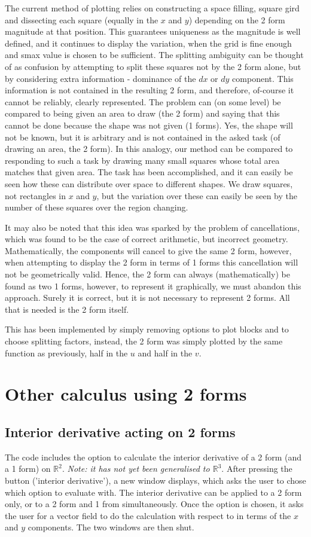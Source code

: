\documentclass[11]{report}
\begin{document}
The current method of plotting relies on constructing a space filling, square gird and dissecting each square (equally in the $x$ and $y$) depending on the 2 form magnitude at that position. This guarantees uniqueness as the magnitude is well defined, and it continues to display the variation, when the grid is fine enough and s\textunderscore max value is chosen to be sufficient.
The splitting ambiguity can be thought of as confusion by attempting to split these squares not by the 2 form alone, but by considering extra information - dominance of the $dx$ or $dy$ component. This information is not contained in the resulting 2 form, and therefore, of-course it cannot be reliably, clearly represented.
The problem can (on some level) be compared to being given an area to draw (the 2 form) and saying that this cannot be done because the shape was not given (1 forms). Yes, the shape will not be known, but it is arbitrary and is not contained in the asked task (of drawing an area, the 2 form). In this analogy, our method can be compared to responding to such a task by drawing many small squares whose total area matches that given area. The task has been accomplished, and it can easily be seen how these can distribute over space to different shapes. We draw squares, not rectangles in $x$ and $y$, but the variation over these can easily be seen by the number of these squares over the region changing.

It may also be noted that this idea was sparked by the problem of cancellations, which was found to be the case of correct arithmetic, but incorrect geometry. Mathematically, the components will cancel to give the same 2 form, however, when attempting to display the 2 form in terms of 1 forms this cancellation will not be geometrically valid.
Hence, the 2 form can always (mathematically) be found as two 1 forms, however, to represent it graphically, we must abandon this approach. Surely it is correct, but it is not necessary to represent 2 forms. All that is needed is the 2 form itself.

This has been implemented by simply removing options to plot blocks and to choose splitting factors, instead, the 2 form was simply plotted by the same function as previously, half in the $u$ and half in the $v$.

\section{Other calculus using 2 forms}
\subsection{Interior derivative acting on 2 forms}
The code includes the option to calculate the interior derivative of a 2 form (and a 1 form) on $\mathbb{R}^{2}$. \textit{Note: it has not yet been generalised to $\mathbb{R}^{3}$}. After pressing the button ('interior derivative'), a new window displays, which asks the user to chose which option to evaluate with. The interior derivative can be applied to a 2 form only, or to a 2 form and 1 from simultaneously. Once the option is chosen, it asks the user for a vector field to do the calculation with respect to in terms of the $x$ and $y$ components. The two windows are then shut.
\end{document}
